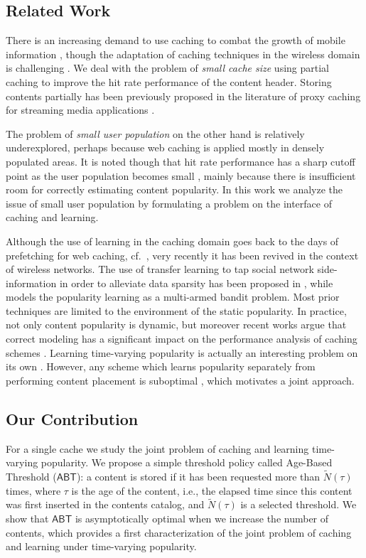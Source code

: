 \documentclass[10pt, conference, letterpaper]{IEEEtran}
\newcommand{\ABT}{\textsf{ABT}}
\newcommand{\spyros}[1]{{#1}}
\begin{document}
\subsection{Related Work}

There is an increasing demand to use caching to combat the growth of mobile information \cite{IdealvsReality}, though the adaptation of caching techniques in the wireless domain is challenging \cite{5Gcaching}.
We deal with the problem of \emph{small cache size} using partial caching \cite{Ahle14} to improve the hit rate performance of the content header.
Storing contents partially has been previously proposed in the literature of proxy caching for streaming media applications \cite{Liu04,Sen99}.

The problem of \emph{small user population} on the other hand is relatively underexplored, perhaps because web caching is applied mostly in densely populated areas. It is noted though that hit rate performance has a sharp cutoff point as the user population becomes small \cite{Wolman}, mainly because there is insufficient room for correctly estimating content popularity. In this work we analyze the issue of small user population by formulating a problem on the interface of caching and learning.

Although the use of learning in the caching domain goes back to the days of prefetching for web caching, cf.~\cite{Pallis}, very recently it has been revived in the context of wireless networks. The use of transfer learning to tap social network side-information in order to alleviate data sparsity has been proposed in \cite{bastug2014b}, while \cite{Blasco} models the popularity learning as a multi-armed bandit problem. 
Most prior techniques are limited to the environment of the static popularity.
In practice, not only content popularity is dynamic, but moreover recent works argue that correct modeling has a significant impact on the performance analysis of caching schemes \cite{traverso2015,shen}. 
Learning time-varying popularity is actually an interesting problem on its own \cite{Szabo10,Ahmed13}.
However, any scheme which learns popularity separately from performing content placement is suboptimal \cite{moharir}, which  motivates a joint approach.


\subsection{Our Contribution}



For a single cache we study the joint problem of caching and learning time-varying popularity. We propose  a simple threshold policy called \spyros {Age-Based Threshold} ($\ABT$): a content is stored if it has been requested more than $\widetilde N(\tau)$ times, where $\tau$ is the age of the content\spyros {, i.e., the elapsed time since this content was first inserted in the contents catalog}, and $\widetilde N(\tau)$ is a selected threshold. 
We show that $\ABT$ is asymptotically optimal when we increase the number of contents, which provides a first characterization of the joint problem of caching and learning under time-varying popularity.
\end{document}
